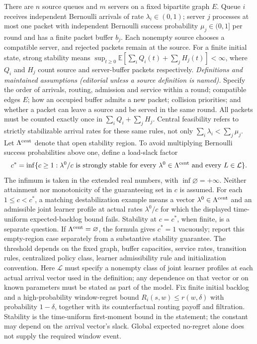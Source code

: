\documentclass[11pt,a4paper]{article}
\begin{document}
There are \(n\) source queues and \(m\) servers on a fixed bipartite graph \(E\). Queue \(i\) receives independent Bernoulli arrivals of rate \(\lambda_i\in(0,1)\); server \(j\) processes at most one packet with independent Bernoulli success probability \(\mu_j\in(0,1]\) per round and has a finite packet buffer \(b_j\). Each nonempty source chooses a compatible server, and rejected packets remain at the source. For a finite initial state, strong stability means \(\sup_{t\ge0}\mathbb E[\sum_iQ_i(t)+\sum_jH_j(t)]<\infty\), where \(Q_i\) and \(H_j\) count source and server-buffer packets respectively. \emph{Definitions and maintained assumptions (editorial unless a source definition is named).} Specify the order of arrivals, routing, admission and service within a round; compatible edges \(E\); how an occupied buffer admits a new packet; collision priorities; and whether a packet can leave a source and be served in the same round. All packets must be counted exactly once in \(\sum_iQ_i+\sum_jH_j\). Central feasibility refers to strictly stabilizable arrival rates for these same rules, not only \(\sum_i\lambda_i<\sum_j\mu_j\). Let \(\Lambda^{\rm cent}\) denote that open stability region. To avoid multiplying Bernoulli success probabilities above one, define a load-slack factor
\[c^* = \inf\{c\ge1:\lambda^0/c\text{ is strongly stable for every }\lambda^0\in\Lambda^{\rm cent}\text{ and every }L\in\mathcal L\}.\]
The infimum is taken in the extended real numbers, with \(\inf\varnothing=+\infty\). Neither attainment nor monotonicity of the guaranteeing set in \(c\) is assumed. For each \(1\le c<c^*\), a matching destabilization example means a vector \(\lambda^0\in\Lambda^{\rm cent}\) and an admissible joint learner profile at actual rates \(\lambda^0/c\) for which the displayed time-uniform expected-backlog bound fails. Stability at \(c=c^*\), when finite, is a separate question. If \(\Lambda^{\rm cent}=\varnothing\), the formula gives \(c^*=1\) vacuously; report this empty-region case separately from a substantive stability guarantee. The threshold depends on the fixed graph, buffer capacities, service rates, transition rules, centralized policy class, learner admissibility rule and initialization convention. Here \(\mathcal L\) must specify a nonempty class of joint learner profiles at each actual arrival vector used in the definition; any dependence on that vector or on known parameters must be stated as part of the model.
Fix finite initial backlog and a high-probability window-regret bound \(R_i(s,w)\le r(w,\delta)\) with probability \(1-\delta\), together with its counterfactual routing payoff and filtration. Stability is the time-uniform first-moment bound in the statement; the constant may depend on the arrival vector’s slack. Global expected no-regret alone does not supply the required window event.
\end{document}
